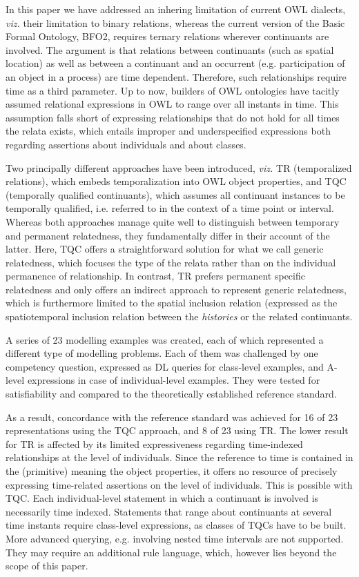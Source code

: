 
In this paper we have addressed an inhering limitation of current OWL dialects,
\emph{viz.} their limitation to binary relations, whereas the current version 
of the Basic Formal Ontology, BFO2, requires ternary relations wherever
continuants are involved. The argument is that relations between continuants 
(such as spatial location) as well as between a continuant and an occurrent 
(e.g. participation of an object in a process) are time dependent. Therefore, 
such relationships require time as a third parameter. 
Up to now, builders of OWL ontologies have tacitly assumed relational expressions
in OWL to range over all instants in time. This assumption falls short of 
expressing relationships that do not hold for all times the relata exists, 
which entails improper and underspecified expressions both regarding assertions about
individuals and about classes.  

Two principally different approaches have been introduced, \emph{viz.} TR 
(temporalized relations), which embeds temporalization into OWL object properties, 
and TQC (temporally qualified continuants), which assumes all continuant instances
to be temporally qualified, i.e. referred to in the context of a time point or 
interval. Whereas both approaches manage quite well to distinguish between 
temporary and permanent relatedness, they fundamentally differ in their account 
of the latter. Here, TQC offers a straightforward solution for what we call 
generic relatedness, which focuses the type of the relata rather than on 
the individual permanence of relationship. In contrast, TR prefers 
permanent specific relatedness and only offers an indirect approach to represent 
generic relatedness, which is furthermore limited to the spatial inclusion 
relation (expressed as the spatiotemporal inclusion relation between the 
\emph{histories} or the related continuants.

A series of 23 modelling examples was created, each of which represented a different
type of modelling problems. Each of them was challenged by one competency question, 
expressed as DL queries for class-level examples, and A-level expressions in case
of individual-level examples. They were tested for satisfiability and compared
to the theoretically established reference standard. 

As a result, concordance with the reference standard was achieved for 16 of 23 
representations using the TQC approach, and 8 of 23 using TR. The lower result for 
TR is affected by its limited expressiveness regarding time-indexed relationships
at the level of individuals. Since the reference to time is contained in the (primitive)
meaning the object properties, it offers no resource of precisely expressing 
time-related assertions on the level of individuals. 
This is possible with TQC. Each individual-level statement in which a continuant 
is involved is necessarily time indexed. Statements that range about continuants
at several time instants require class-level expressions, as classes of TQCs have to be built.
More advanced querying, e.g. involving nested time intervals are not supported.
They may require an additional rule language, which, however lies beyond the scope
of this paper. 

